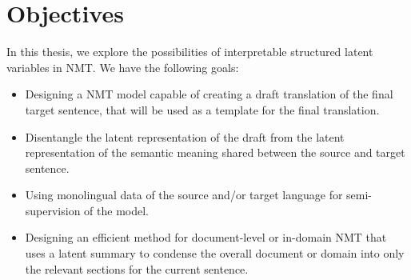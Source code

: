 \section{Objectives}
\label{sec:int_objectives}

In this thesis, we explore the possibilities
of interpretable structured latent variables
in NMT. We have the following goals:

\begin{itemize}
    \item Designing a NMT model capable of creating a
    draft translation of the final target sentence,
    that will be used as a template for the final translation.
    \item Disentangle the latent representation of the
    draft from the latent representation of the semantic meaning
    shared between the source and target sentence.
    \item Using monolingual data of the source and/or target language
    for semi-supervision of the model.
    \item Designing an efficient method for document-level or in-domain
    NMT that uses a latent summary to condense the overall document or domain
    into only the relevant sections for the current sentence.
\end{itemize}